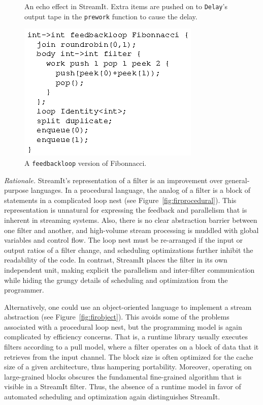 \begin{figure}
\vspace{-6pt}
\caption{An echo effect in StreamIt.  Extra items are pushed on to
  \texttt{Delay}'s output tape in the \texttt{prework} function to
  cause the delay.}
\label{fig:echo}
\vspace{6pt}
\includegraphics{fib-streamit.eps}
\vspace{-6pt}
\caption{A \texttt{feedbackloop} version of Fibonnacci.}
\label{fig:feed}
\end{figure}

\label{sec:oo-rat}
\emph{Rationale.}  StreamIt's representation of a filter is an
improvement over general-purpose languages.  In a procedural language,
the analog of a filter is  a block of statements in a complicated loop
nest  (see   Figure~\ref{fig:firprocedural}).   This  representation  is
unnatural for expressing the feedback and parallelism that is inherent
in  streaming systems.  Also,  there is  no clear  abstraction barrier
between one  filter and another, and high-volume  stream processing is
muddled with global variables and control flow.  The loop nest must be
re-arranged if  the input  or output ratios  of a filter  change, and
scheduling optimizations further inhibit  the readability of the code.
In contrast, StreamIt  places the filter in its  own independent unit,
making explicit  the parallelism and  inter-filter communication while
hiding  the grungy  details of  scheduling and  optimization  from the
programmer.

Alternatively, one could use an object-oriented language to  implement a stream
abstraction (see  Figure~\ref{fig:firobject}).  This avoids  some of the
problems associated  with a procedural loop nest,  but the programming
model is again complicated by efficiency concerns.  That is, a runtime
library usually  executes filters according  to a pull model,  where a
filter operates  on a block of  data that it retrieves  from the input
channel.  The  block size is often  optimized for the cache  size of a
given architecture, thus hampering portability.  Moreover, operating on
large-grained blocks  obscures the fundamental  fine-grained algorithm
that is visible in a StreamIt  filter.  Thus, the absence of a runtime
model  in  favor  of   automated  scheduling  and  optimization  again
distinguishes StreamIt.

